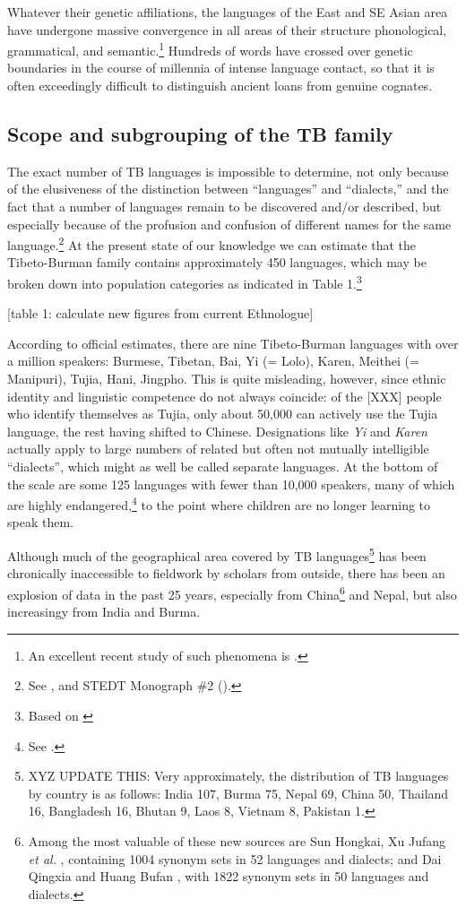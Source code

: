 Whatever their genetic affiliations, the languages of the East and SE Asian area have undergone massive convergence in all areas of their structure  phonological, grammatical, and semantic.\footnote{An excellent recent study of such phenomena is \citealt{TK-LCCGL}.}  Hundreds of words have crossed over genetic boundaries in the course of millennia of intense language contact, so that it is often exceedingly difficult to distinguish ancient loans from genuine cognates.

\subsection{Scope and subgrouping of the TB family}

The exact number of TB languages is impossible to determine, not only because of the elusiveness of the distinction between “languages” and “dialects,” and the fact that a number of languages remain to be discovered and/or described, but especially because of the profusion and confusion of different names for the same language.\footnote{See \citealt{JAM-LDTB}, and STEDT Monograph \#2 (\citealt{JAM-LDTB2}).} At the present state of our knowledge we can estimate that the Tibeto-Burman family contains approximately 450 languages, which may be broken down into population categories as indicated in Table 1.\footnote{Based on \citealt{LSF-ELW17}}

[table 1: calculate new figures from current Ethnologue]

According to official estimates, there are nine Tibeto-Burman languages with over a million speakers: Burmese, Tibetan, Bai, Yi (= Lolo), Karen, Meithei (= Manipuri), Tujia, Hani, Jingpho. This is quite misleading, however, since ethnic identity and linguistic competence do not always coincide: of the [XXX] people who identify themselves as Tujia, only about 50,000 can actively use the Tujia language, the rest having shifted to Chinese. Designations like {\it Yi} and {\it Karen} actually apply to large numbers of related but often not mutually intelligible “dialects”, which might as well be called separate languages. At the bottom of the scale are some 125 languages with fewer than 10,000 speakers, many of which are highly endangered,\footnote{See \citealt{JAM-ELMSEA}.} to the point where children are no longer learning to speak them.

Although much of the geographical area covered by TB languages\footnote{XYZ UPDATE THIS: Very approximately, the distribution of TB languages by country is as follows: India 107, Burma 75, Nepal 69, China 50, Thailand 16, Bangladesh 16, Bhutan 9, Laos 8, Vietnam 8, Pakistan 1.} has been chronically inaccessible to fieldwork by scholars from outside, there has been an explosion of data in the past 25 years, especially from China\footnote{Among the most valuable of these new sources are Sun Hongkai, Xu Jufang {\it et al.} \citeyearpar{ZMYYC}, containing 1004 synonym sets in 52 languages and dialects; and Dai Qingxia and Huang Bufan \citeyearpar{TBL}, with 1822 synonym sets in 50 languages and dialects.} and Nepal, but also increasingy from India and Burma.

